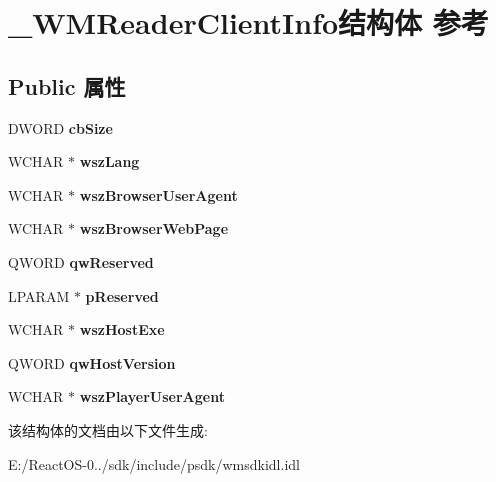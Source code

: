 \hypertarget{struct___w_m_reader_client_info}{}\section{\+\_\+\+W\+M\+Reader\+Client\+Info结构体 参考}
\label{struct___w_m_reader_client_info}
\subsection*{Public 属性}
\begin{DoxyCompactItemize}
\item 
\mbox{\label{struct___w_m_reader_client_info_a0030ef577959b634a1ae873d88341ead}} 
D\+W\+O\+RD {\bfseries cb\+Size}
\item 
\mbox{\label{struct___w_m_reader_client_info_aa436f5c7e3ce806c633fc1875612e075}} 
W\+C\+H\+AR $\ast$ {\bfseries wsz\+Lang}
\item 
\mbox{\label{struct___w_m_reader_client_info_aa6d8032231e38dc2bf724103fb61f430}} 
W\+C\+H\+AR $\ast$ {\bfseries wsz\+Browser\+User\+Agent}
\item 
\mbox{\label{struct___w_m_reader_client_info_a7068d1c42b69629c1d7a22ec4d4b771b}} 
W\+C\+H\+AR $\ast$ {\bfseries wsz\+Browser\+Web\+Page}
\item 
\mbox{\label{struct___w_m_reader_client_info_a2a62e92c0a9c05668406836080384b08}} 
Q\+W\+O\+RD {\bfseries qw\+Reserved}
\item 
\mbox{\label{struct___w_m_reader_client_info_a08e75b41a66fe9c5d8509f3481465abb}} 
L\+P\+A\+R\+AM $\ast$ {\bfseries p\+Reserved}
\item 
\mbox{\label{struct___w_m_reader_client_info_abce9701f71dc007f945197b570b45fba}} 
W\+C\+H\+AR $\ast$ {\bfseries wsz\+Host\+Exe}
\item 
\mbox{\label{struct___w_m_reader_client_info_a3dfa2feb006597e5271257d33411baa0}} 
Q\+W\+O\+RD {\bfseries qw\+Host\+Version}
\item 
\mbox{\label{struct___w_m_reader_client_info_a70c14b9743ffad2e2d7a071fa56e8a5b}} 
W\+C\+H\+AR $\ast$ {\bfseries wsz\+Player\+User\+Agent}
\end{DoxyCompactItemize}


该结构体的文档由以下文件生成\+:\begin{DoxyCompactItemize}
\item 
E\+:/\+React\+O\+S-\/0../sdk/include/psdk/wmsdkidl.\+idl\end{DoxyCompactItemize}
